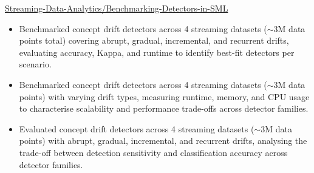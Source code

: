  {}
{
}
{\href{https://github.com/Streaming-Data-Analytics/2024-2025_Benchmarking-Detectors-in-SML}
{Streaming-Data-Analytics/Benchmarking-Detectors-in-SML}}
\begin{itemize}

    \ifde
        \item Benchmarked concept drift detectors across 4 streaming datasets ($\sim$3M data points total) covering abrupt, gradual, incremental, and recurrent drifts, evaluating accuracy, Kappa, and runtime to identify best-fit detectors per scenario.
    \else
        \ifhpc
            \item Benchmarked concept drift detectors across 4 streaming datasets ($\sim$3M data points) with varying drift types, measuring runtime, memory, and CPU usage to characterise scalability and performance trade-offs across detector families.
        \else
            \item Evaluated concept drift detectors across 4 streaming datasets ($\sim$3M data points) with abrupt, gradual, incremental, and recurrent drifts, analysing the trade-off between detection sensitivity and classification accuracy across detector families.
        \fi
    \fi

\end{itemize}

\medskip
